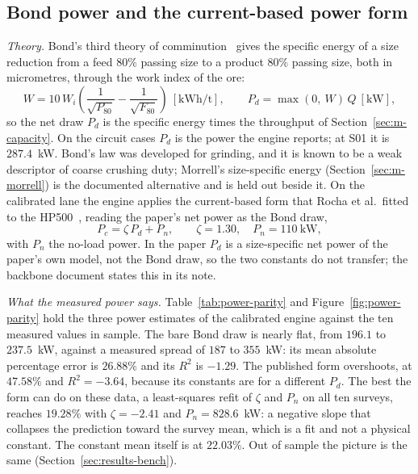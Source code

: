 \subsection{Bond power and the current-based power form}\label{sec:m-bond}

\emph{Theory.} Bond's third theory of comminution~\cite{bond1952} gives the specific energy of a size reduction from a feed $80\%$
passing size to a product $80\%$ passing size, both in micrometres, through the work index of the ore:
\begin{equation}
W = 10\,W_i\left(\frac{1}{\sqrt{P_{80}}} - \frac{1}{\sqrt{F_{80}}}\right)\ [\mathrm{kWh/t}],\qquad
P_d = \max(0,\ W)\,Q\ [\mathrm{kW}],
\label{eq:bond}
\end{equation}
so the net draw $P_d$ is the specific energy times the throughput of Section~\ref{sec:m-capacity}. On the circuit cases $P_d$ is the
power the engine reports; at S01 it is $287.4$~kW. Bond's law was developed for grinding, and it is known to be a weak descriptor of
coarse crushing duty; Morrell's size-specific energy (Section~\ref{sec:m-morrell}) is the documented alternative and is held out beside
it. On the calibrated lane the engine applies the current-based form that Rocha et al.\ fitted to the HP500~\cite{rocha2024}, reading
the paper's net power as the Bond draw,
\begin{equation}
P_c = \zeta\,P_d + P_n,\qquad \zeta = 1.30,\quad P_n = 110\ \mathrm{kW},
\label{eq:pc}
\end{equation}
with $P_n$ the no-load power. In the paper $P_d$ is a size-specific net power of the paper's own model, not the Bond draw, so the two
constants do not transfer; the backbone document states this in its note.

\emph{What the measured power says.} Table~\ref{tab:power-parity} and Figure~\ref{fig:power-parity} hold the three power estimates of the
calibrated engine against the ten measured values in sample. The bare Bond draw is nearly flat, from $196.1$ to $237.5$~kW, against a
measured spread of $187$ to $355$~kW: its mean absolute percentage error is $26.88\%$ and its $R^2$ is $-1.29$. The published form
overshoots, at $47.58\%$ and $R^2=-3.64$, because its constants are for a different $P_d$. The best the form can do on these data, a
least-squares refit of $\zeta$ and $P_n$ on all ten surveys, reaches $19.28\%$ with $\zeta=-2.41$ and $P_n=828.6$~kW: a negative slope that
collapses the prediction toward the survey mean, which is a fit and not a physical constant. The constant mean itself is at $22.03\%$. Out
of sample the picture is the same (Section~\ref{sec:results-bench}).

